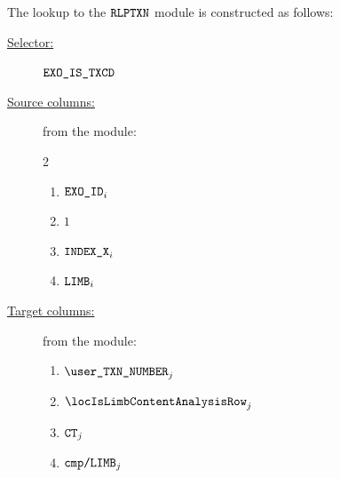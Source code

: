 
The lookup to the $\texttt{RLPTXN}$ module is constructed as follows:
\begin{description}
	\item[\underline{Selector:}] $\texttt{EXO\_IS\_TXCD}$
	\item[\underline{Source columns:}] from the \mmioMod{} module:
			\begin{multicols}{2}
			\begin{enumerate}
				\item $\texttt{EXO\_ID}  _{i}$
				\item $1$
				\item $\texttt{INDEX\_X} _{i}$
				\item $\texttt{LIMB}   _{i}$
			\end{enumerate}
		\end{multicols}
		\item[\underline{Target columns:}] from the \rlpTxnMod{} module:
			\begin{enumerate}
				\item $\userTransactionNumber       			_{j}$
				\item $\locIsLimbContentAnalysisRow 			_{j}$
				\item $\texttt{CT}                          			_{j}$
				\item $\texttt{cmp}\texttt{/}\texttt{{\texttt{LIMB}}}             _{j}$
			\end{enumerate}
\end{description}
